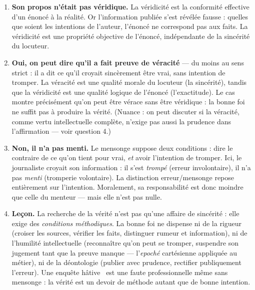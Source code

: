 \documentclass[11pt]{article}
\newcommand{\cle}[1]{{\popxbold\color{popdark}#1}}
\begin{document}
\begin{corrige}
\begin{enumerate}
\item \textbf{Son propos n'était pas véridique.} La \cle{véridicité} est la conformité effective d'un énoncé à la réalité. Or l'information publiée s'est révélée fausse : quelles que soient les intentions de l'auteur, l'énoncé ne correspond pas aux faits. La véridicité est une propriété objective de l'énoncé, indépendante de la sincérité du locuteur.
\item \textbf{Oui, on peut dire qu'il a fait preuve de véracité} — du moins au sens strict : il a dit ce qu'il croyait sincèrement être vrai, sans intention de tromper. La \cle{véracité} est une qualité morale du locuteur (la sincérité), tandis que la véridicité est une qualité logique de l'énoncé (l'exactitude). Le cas montre précisément qu'on peut être vérace sans être véridique : la bonne foi ne suffit pas à produire la vérité. (Nuance : on peut discuter si la véracité, comme vertu intellectuelle complète, n'exige pas aussi la prudence dans l'affirmation — voir question 4.)
\item \textbf{Non, il n'a pas menti.} Le \cle{mensonge} suppose deux conditions : dire le contraire de ce qu'on tient pour vrai, \emph{et} avoir l'intention de tromper. Ici, le journaliste croyait son information : il s'est \emph{trompé} (erreur involontaire), il n'a pas \emph{menti} (tromperie volontaire). La distinction erreur/mensonge repose entièrement sur l'intention. Moralement, sa responsabilité est donc moindre que celle du menteur — mais elle n'est pas nulle.
\item \textbf{Leçon.} La recherche de la vérité n'est pas qu'une affaire de sincérité : elle exige des \emph{conditions méthodiques}. La bonne foi ne dispense ni de la rigueur (croiser les sources, vérifier les faits, distinguer rumeur et information), ni de l'humilité intellectuelle (reconnaître qu'on peut se tromper, suspendre son jugement tant que la preuve manque — l'\emph{epoché} cartésienne appliquée au métier), ni de la déontologie (publier avec prudence, rectifier publiquement l'erreur). Une enquête \guillemotleft hâtive \guillemotright\ est une faute professionnelle même sans mensonge : la vérité est un devoir de méthode autant que de bonne intention.
\end{enumerate}
\end{corrige}
\end{document}

